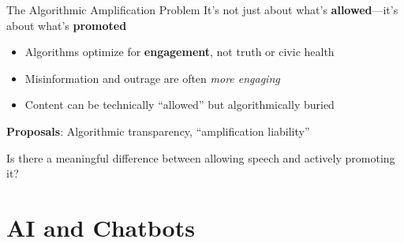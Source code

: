 ﻿\documentclass[aspectratio=169,11pt]{beamer}
\begin{document}
\begin{frame}[shrink=8]{The Algorithmic Amplification Problem}
It's not just about what's \textbf{allowed}---it's about what's \textbf{promoted}

\begin{itemize}
    \item Algorithms optimize for \textbf{engagement}, not truth or civic health
    \item Misinformation and outrage are often \textit{more engaging}
    \item Content can be technically ``allowed'' but algorithmically buried
\end{itemize}

\vspace{0.3cm}
\begin{center}
\end{center}

\vspace{0.2cm}
\textbf{Proposals}: Algorithmic transparency, ``amplification liability''

\begin{discussionbox}[Discussion]
Is there a meaningful difference between allowing speech and actively promoting it?
\end{discussionbox}
\end{frame}


\section{AI and Chatbots}
\end{document}
